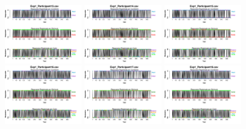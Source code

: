 \begin{figure}[th]
\includegraphics[width=0.30\textwidth]{Figures/BiasResp_Exp1_P13} \includegraphics[width=0.30\textwidth]{Figures/BiasResp_Exp1_P14} \includegraphics[width=0.30\textwidth]{Figures/BiasResp_Exp1_P15}
\includegraphics[width=0.30\textwidth]{Figures/BiasResp_Exp1_P16} \includegraphics[width=0.30\textwidth]{Figures/BiasResp_Exp1_P17} \includegraphics[width=0.30\textwidth]{Figures/BiasResp_Exp1_P18}

\end{figure}
